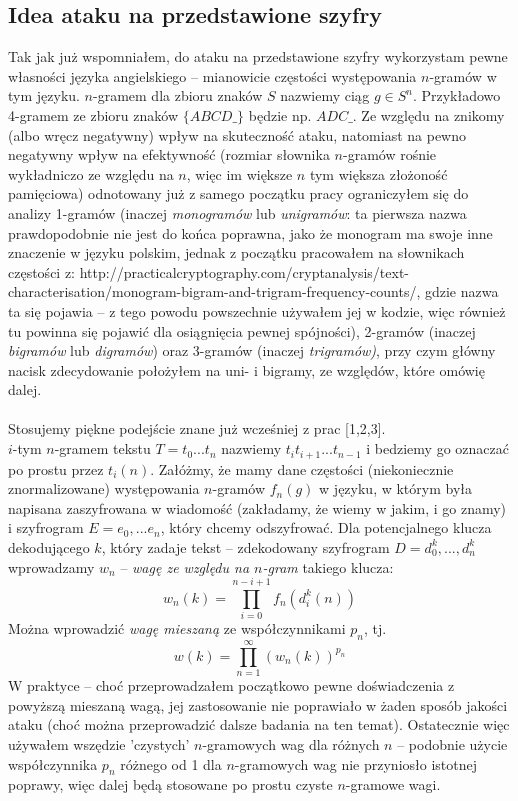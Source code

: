 \documentclass[a4paper]{article}
\begin{document}
\subsection{Idea ataku na przedstawione szyfry}
Tak jak już wspomniałem, do ataku na przedstawione szyfry wykorzystam pewne własności języka angielskiego – mianowicie częstości występowania $n$-gramów w tym języku. $n$-gramem dla zbioru znaków $S$ nazwiemy ciąg $g \in S^n$. Przykładowo 4-gramem ze zbioru znaków $\{ABCD\_\}$ będzie np. $ADC\_$. Ze względu na znikomy (albo wręcz negatywny) wpływ na skuteczność ataku, natomiast na pewno negatywny wpływ na efektywność (rozmiar słownika $n$-gramów rośnie wykładniczo ze względu na $n$, więc im większe $n$ tym większa złożoność pamięciowa) odnotowany już z samego początku pracy ograniczyłem się do analizy 1-gramów (inaczej \textit{monogramów} lub \textit{unigramów}: ta pierwsza nazwa prawdopodobnie nie jest do końca poprawna, jako że monogram ma swoje inne znaczenie w języku polskim, jednak z początku pracowałem na słownikach częstości z: http://practicalcryptography.com/cryptanalysis/text-characterisation/monogram-bigram-and-trigram-frequency-counts/, gdzie nazwa ta się pojawia – z tego powodu powszechnie używałem jej w kodzie, więc również tu powinna się pojawić dla osiągnięcia pewnej spójności), 2-gramów (inaczej \textit{bigramów} lub \textit{digramów}) oraz 3-gramów (inaczej \textit{trigramów)}, przy czym główny nacisk zdecydowanie położyłem na uni- i bigramy, ze względów, które omówię dalej.\\\\
Stosujemy piękne podejście znane już wcześniej z prac [1,2,3]. \\
$i$-tym $n$-gramem tekstu $T = t_0...t_n$ nazwiemy $t_it_{i+1}...t_{n-1}$ i bedziemy go oznaczać po prostu przez $t_i(n)$. Załóżmy, że mamy dane częstości (niekoniecznie znormalizowane) występowania $n$-gramów $f_n(g)$ w języku, w którym była napisana zaszyfrowana w wiadomość (zakładamy, że wiemy w jakim, i go znamy) i szyfrogram $E=e_0,...e_n$, który chcemy odszyfrować. Dla potencjalnego klucza dekodującego $k$, który zadaje tekst – zdekodowany szyfrogram $D=d_0^k, ..., d_n^k$ wprowadzamy $w_n$ – \textit{wagę ze względu na $n$-gram} takiego klucza:
$$w_n(k) = \prod\limits_{i=0}^{n-i+1} f_n(d_i^k(n))$$
Można wprowadzić \textit{wagę mieszaną} ze współczynnikami $p_n$, tj.
$$w(k) = \prod\limits_{n=1}^{\infty} (w_n(k))^{p_n}$$
W praktyce – choć przeprowadzałem początkowo pewne doświadczenia z powyższą mieszaną wagą, jej zastosowanie nie poprawiało w żaden sposób jakości ataku (choć można przeprowadzić dalsze badania na ten temat). Ostatecznie więc używałem wszędzie 'czystych' $n$-gramowych wag dla różnych $n$ – podobnie użycie współczynnika $p_n$ różnego od 1 dla $n$-gramowych wag nie przyniosło istotnej poprawy, więc dalej będą stosowane po prostu czyste $n$-gramowe wagi.\\\\
\end{document}
